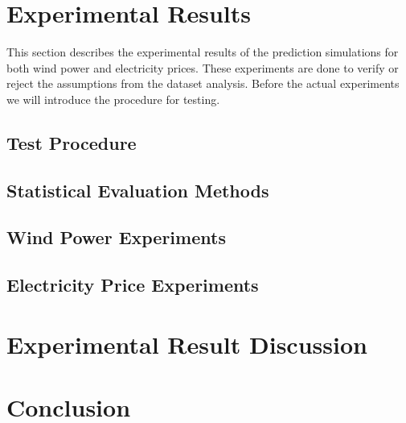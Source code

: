 \documentclass[twoside,11pt,openright]{report}
\begin{document}

\chapter{Experimental Results}
\label{ch:experimentalResults}
This section describes the experimental results of the prediction simulations for both wind power and electricity prices. These experiments are done to verify or reject the assumptions from the dataset analysis. Before the actual experiments we will introduce the procedure for testing.
\section{Test Procedure}
\label{sec:testProcedure}

\section{Statistical Evaluation Methods}
\label{sec:statisticalEvaluation}

\newpage
\section{Wind Power Experiments}
\label{sec:windProductionExperiments}

\newpage
\section{Electricity Price Experiments}
\label{sec:priceExperiments}

\newpage


\chapter{Experimental Result Discussion}
\label{ch:experimentalResultDiscussions}




\chapter{Conclusion}
\label{ch:conclusion}

\end{document}
